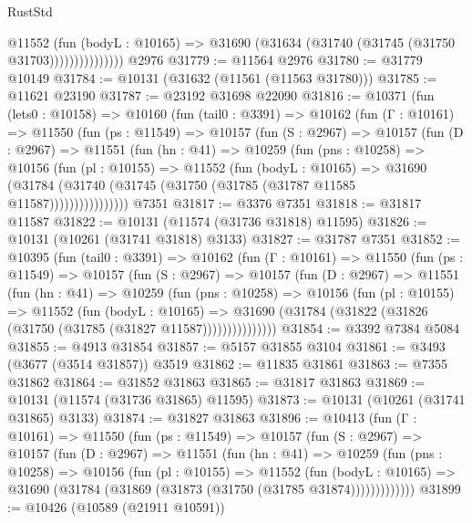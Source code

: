 \begin{lexlean}{RustStd}
\begin{coremodule}
                      @11552
                        (fun (bodyL : @10165) =>
                        @31690 (@31634 (@31740 (@31745 (@31750 @31703)))))))))))))))
    @2976
@31779 := @11564 @2976
@31780 := @31779 @10149
@31784 := @10131 (@31632 (@11561 (@11563 @31780)))
@31785 := @11621 @23190
@31787 := @23192 @31698 @22090
@31816 := @10371
    (fun (lets0 : @10158) =>
    @10160
      (fun (tail0 : @3391) =>
      @10162
        (fun (Γ : @10161) =>
        @11550
          (fun (ps : @11549) =>
          @10157
            (fun (S : @2967) =>
            @10157
              (fun (D : @2967) =>
              @11551
                (fun (hn : @41) =>
                @10259
                  (fun (pns : @10258) =>
                  @10156
                    (fun (pl : @10155) =>
                    @11552
                      (fun (bodyL : @10165) =>
                      @31690
                        (@31784
                          (@31740 (@31745 (@31750 (@31785 (@31787 @11585 @11587))))))))))))))))
    @7351
@31817 := @3376 @7351
@31818 := @31817 @11587
@31822 := @10131 (@11574 (@31736 @31818) @11595)
@31826 := @10131 (@10261 (@31741 @31818) @3133)
@31827 := @31787 @7351
@31852 := @10395
    (fun (tail0 : @3391) =>
    @10162
      (fun (Γ : @10161) =>
      @11550
        (fun (ps : @11549) =>
        @10157
          (fun (S : @2967) =>
          @10157
            (fun (D : @2967) =>
            @11551
              (fun (hn : @41) =>
              @10259
                (fun (pns : @10258) =>
                @10156
                  (fun (pl : @10155) =>
                  @11552
                    (fun (bodyL : @10165) =>
                    @31690 (@31784 (@31822 (@31826 (@31750 (@31785 (@31827 @11587)))))))))))))))
@31854 := @3392 @7384 @5084
@31855 := @4913 @31854
@31857 := @5157 @31855 @3104
@31861 := @3493 (@3677 (@3514 @31857)) @3519
@31862 := @11835 @31861
@31863 := @7355 @31862
@31864 := @31852 @31863
@31865 := @31817 @31863
@31869 := @10131 (@11574 (@31736 @31865) @11595)
@31873 := @10131 (@10261 (@31741 @31865) @3133)
@31874 := @31827 @31863
@31896 := @10413
    (fun (Γ : @10161) =>
    @11550
      (fun (ps : @11549) =>
      @10157
        (fun (S : @2967) =>
        @10157
          (fun (D : @2967) =>
          @11551
            (fun (hn : @41) =>
            @10259
              (fun (pns : @10258) =>
              @10156
                (fun (pl : @10155) =>
                @11552
                  (fun (bodyL : @10165) =>
                  @31690 (@31784 (@31869 (@31873 (@31750 (@31785 @31874)))))))))))))
@31899 := @10426 (@10589 (@21911 @10591))

\end{coremodule}
\end{lexlean}
